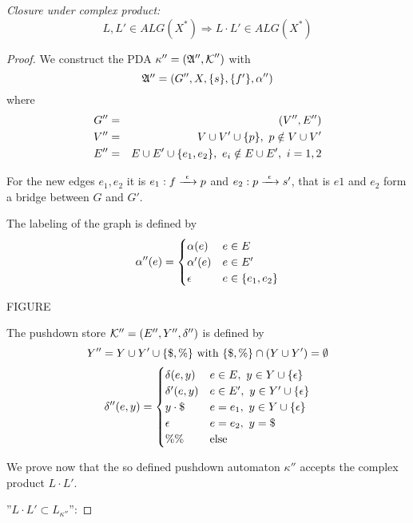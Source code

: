 {\em Closure under complex product:}
\[ L,L' \in ALG(X^*) \Rightarrow L \cdot L' \in ALG(X^*) \]
\begin{proof}
We construct the PDA $\kappa'' = (\mbox{$\mathfrak{A''}$}, \mbox{$\mathcal{K}$}'')$ with 
\[\mbox{$\mathfrak{A''}$} = (G'', X, \mbox{$\{s\}$}, \mbox{$\{f'\}$}, \alpha'')\]
where
\begin{eqnarray*}
G'' &=& (V'', E'') \\
V'' &=& V \cup V' \cup \mbox{$\{p\}$},\ p \notin V \cup V' \\
E'' &=& E \cup E' \cup \mbox{$\{e_1, e_2\}$},\ e_i \notin E \cup E',\ i = 1, 2
\end{eqnarray*}

For the new edges $e_1, e_2$ it is $e_1: f \xrightarrow{\ {\epsilon}\ } p$ and $e_2: p
\xrightarrow{\ {\epsilon}\ } s'$, that is $e1$ and $e_2$ form a bridge between $G$ and $G'$.

The labeling of the graph is defined by 
\[ \alpha''(e) = \begin{cases} 
\alpha(e) & e \in E \\
\alpha'(e) & e \in E' \\
\epsilon & e \in \mbox{$\{e_1, e_2\}$} 
\end{cases}\]

FIGURE

The pushdown store $\mbox{$\mathcal{K''}$} = (E'', Y'', \delta'')$ is defined by
\[ Y'' = Y \cup Y' \cup \mbox{$\{\$, \%\}$} \text{ with }\mbox{$\{\$, \%\}$} \cap (Y \cup
Y') = \emptyset \]
\[ \delta''(e, y) = \begin{cases}
\delta(e, y) & e \in E,\ y\in Y \cup \mbox{$\{\epsilon\}$} \\
\delta'(e, y) & e \in E',\ y\in Y' \cup \mbox{$\{\epsilon\}$} \\
y \cdot \$ & e = e_1,\ y \in Y \cup \mbox{$\{\epsilon\}$} \\
\epsilon & e = e_2,\ y = \$ \\
\%\% & \text{else}
\end{cases}\]

We prove now that the so defined pushdown automaton $\kappa''$ accepts the
complex product $L \cdot L'$.

''$L \cdot L' \subset L_{\kappa''}$'':




\end{proof}



































